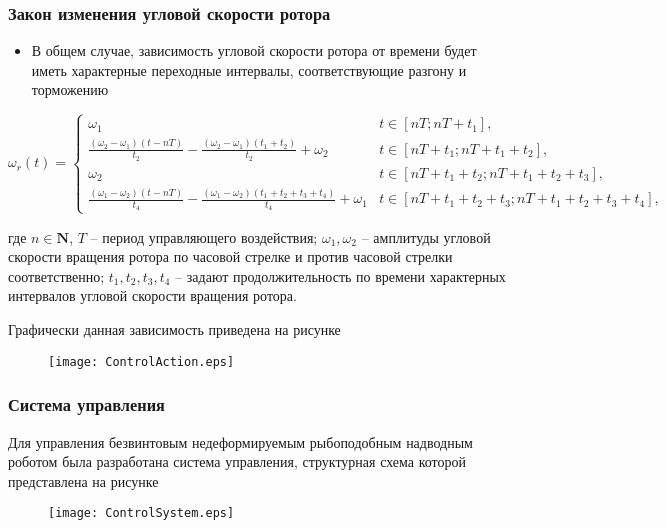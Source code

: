 \begin{frame}
\frametitle{Закон изменения угловой скорости ротора}



	\begin{itemize}
		\item В общем случае, зависимость угловой скорости ротора от времени будет иметь характерные переходные интервалы, соответствующие разгону и торможению 
	\end{itemize}
		\scriptsize 
		\begin{equation*}
		\omega_r(t) =
		\begin{cases}
		
		\omega_1 & t \in \left[ nT;  nT + t_1 \right] ,\\
		
		\frac{(\omega_2 - \omega_1)(t-nT)}{t_2} - \frac{(\omega_2 - \omega_1)(t_1+t_2)}{t_2} + \omega_2 & t \in \left[ nT + t_1;  nT + t_1+t_2 \right], \\
		
		\omega_2 & t \in \left[ nT + t_1+t_2;  nT + t_1+t_2+t_3 \right] ,\\
		
		\frac{(\omega_1 - \omega_2)(t-nT)}{t_4} - \frac{(\omega_1 - \omega_2)(t_1+t_2+t_3+t_4)}{t_4} + \omega_1 &t \in \left[ nT + t_1 + t_2+t_3;  nT + t_1+t_2+t_3+t_4 \right] ,
		
		\end{cases}
		\label{omegaRotorGeneral}
		\end{equation*}
		
		\small
		где $n \in \mathbf{N}$, $T$ -- период управляющего воздействия; $ \omega_1, \omega_2 $ -- амплитуды угловой скорости вращения ротора по часовой стрелке и против часовой стрелки соответственно; $t_1, t_2, t_3, t_4$ -- задают продолжительность по времени характерных интервалов угловой скорости вращения ротора. 
		
		
		Графически данная зависимость приведена на рисунке
		
		\begin{figure}[!ht]
			\centering
			\texttt{[image: ControlAction.eps]}
		\end{figure}
	
	
\end{frame}




\begin{frame}
\frametitle{Система управления}
Для управления безвинтовым недеформируемым рыбоподобным надводным роботом была разработана система управления, структурная схема которой представлена на рисунке

\begin{figure}[!h]
	\centering
	\texttt{[image: ControlSystem.eps]}
\end{figure}

\end{frame}

